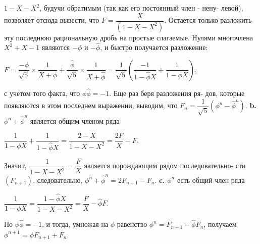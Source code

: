 \documentclass{mai_book}
\begin{document}
$1-X-X^2$, будучи обратимым (так как его постоянный член - нену-
левой), позволяет отсюда вывести, что $F=\dfrac{X}{(1-X-X^2)}$. Остается только
разложить эту последнюю рациональную дробь на простые слагаемые.
Нулями многочлена $X^2+X-1$ являются $-\phi$ и $-\hat{\phi}$, и быстро получается
разложение:
\begin{center}
$F=\dfrac{-\phi}{\sqrt{5}}\times\dfrac{1}{X+\phi}+\dfrac{\hat{\phi}}{\sqrt{5}}\times\dfrac{1}{X+\hat{\phi}} = \dfrac{1}{\sqrt{5}}\left(\dfrac{-1}{1-\hat{\phi}X}+\dfrac{1}{1-\phi X}\right)$,
\end{center}
с учетом того факта, что $\phi\hat{\phi} = -1$. Еще раз беря разложения ря-
дов, которые появляются в этом последнем выражении, выводим, что
$F_{n}=\dfrac{1}{\sqrt{5}}(\phi^n-\hat{\phi}^n)$.\newline
\hspace*{15pt}\textbf{b.} $\phi^n+\hat{\phi}^n$ является общим членом ряда
\begin{center}
$\dfrac{1}{1-\phi X}+\dfrac{1}{1-\hat{\phi}X}=\dfrac{2-X}{1-X-X^2}=\dfrac{2F}{X}-F$.
\end{center}
Значит, $\dfrac{1}{1-X-X^2}=\dfrac{F}{X}$ является порождающим рядом последовательно-
сти $(F_{n+1})$, следовательно, $\phi^n+\hat{\phi}^n=2F_{n+1}-F_{n}$.\newline
\hspace*{15pt}\textbf{c.} $\phi^n$ есть общий член ряда
\begin{center}
$\dfrac{1}{1-\phi X}=\dfrac{1-\hat{\phi} X}{1-X-X^2}=\dfrac{F}{X}-\hat{\phi}F$.
\end{center}

Но $\phi\hat{\phi}=-1$, и тогда, умножая на $\phi$ равенство $\phi^n=F_{n+1}-\hat{\phi}F_{n}$, получаем
$\phi^{n+1}=\phi F_{n+1}+F_{n}$.
\end{document}
